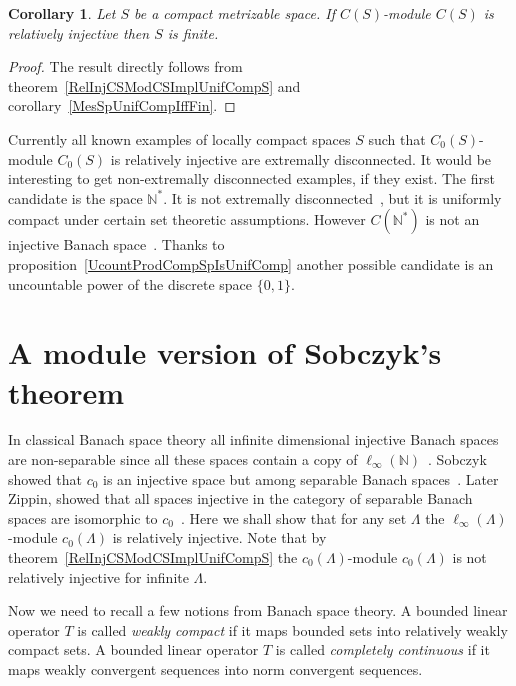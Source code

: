 \documentclass[12pt]{article}
\newtheorem{corollary}[theorem]{Corollary}
\begin{document}
\begin{corollary}\label{CSModCSRelInjImplSHasNoConvSeq} Let $S$ be a compact
    metrizable space. If $C(S)$-module $C(S)$ is relatively injective then $S$
    is finite.
\end{corollary}
\begin{proof} The result directly follows from
    theorem~\ref{RelInjCSModCSImplUnifCompS} and
    corollary~\ref{MesSpUnifCompIffFin}.
\end{proof}

Currently all known examples of locally compact spaces $S$ such that
$C_0(S)$-module $C_0(S)$ is relatively injective are extremally disconnected. It
would be interesting to get non-extremally disconnected examples, if they exist.
The first candidate is the space $\mathbb{N}^*$. It is not extremally
disconnected~\cite[example 6.2.31]{EngkingGenTop}, but it is uniformly compact
under certain set theoretic assumptions. However $C(\mathbb{N}^*)$ is not an
injective Banach space~\cite[corollary 2]{AmirProjContFuncSp}. Thanks to
proposition~\ref{UcountProdCompSpIsUnifComp} another possible candidate is an
uncountable power of the discrete space $\{0, 1\}$.


\section{A module version of Sobczyk's theorem}\label{SectionExamples}

In classical Banach space theory all infinite dimensional injective Banach
spaces are non-separable since all these spaces contain a copy of
$\ell_\infty(\mathbb{N})$~\cite[corollary 1.1.4]{RosOnRelDisjFamOfMeas}. Sobczyk
showed that $c_0$ is an injective space but among separable Banach
spaces~\cite[theorem 5]{SobProjmOnc0}. Later Zippin, showed  that all spaces
injective in the category of separable Banach spaces are isomorphic to
$c_0$~\cite{ZipSepExtProbm}.  Here we shall show that for any set $\Lambda$ the
$\ell_\infty(\Lambda)$-module $c_0(\Lambda)$ is relatively injective. Note that
by theorem~\ref{RelInjCSModCSImplUnifCompS} the $c_0(\Lambda)$-module
$c_0(\Lambda)$ is not relatively injective for infinite $\Lambda$.

Now we need to recall a few notions from Banach space theory. A bounded linear
operator $T$ is called \textit{weakly compact} if it maps bounded sets into
relatively weakly compact sets. A bounded linear operator $T$ is called
\textit{completely continuous} if it maps weakly convergent sequences into norm
convergent sequences.
\end{document}
